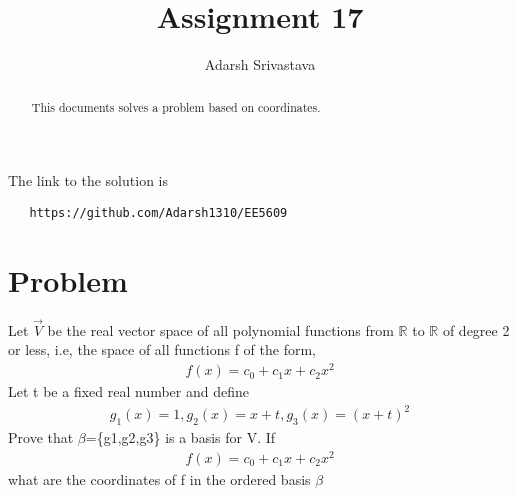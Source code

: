 \documentclass[journal,12pt,twocolumn]{IEEEtran}
\begin{document}
       \def\rightbox#1{\makebox[0in][r]{#1}}
       \def\centbox#1{\makebox[0in]{#1}}
       \def\topbox#1{\raisebox{-\baselineskip}[0in][0in]{#1}}
       \def\midbox#1{\raisebox{-0.5\baselineskip}[0in][0in]{#1}}
  \vspace{3cm}
  \title{Assignment 17}
  \author{Adarsh Srivastava}
  \maketitle
  \newpage
  \bigskip
  \renewcommand{\thetable}{\theenumi}
  The link to the solution is
  \begin{lstlisting}
   https://github.com/Adarsh1310/EE5609
  \end{lstlisting}
  \begin{abstract}
  This documents solves a problem based on coordinates.
  \end{abstract}
   \section{\textbf{Problem}}
   Let $\vec{V}$ be the real vector space of all polynomial functions from $\mathbb{R}$ to $\mathbb{R}$ of degree 2 or less, i.e, the space of all functions f of the form,
   \begin{align*}
   f(x)=c_0+c_1x+c_2x^2
   \end{align*} 
   Let t be a fixed real number and define
   \begin{align*}
   g_1(x)=1,        g_2(x)=x+t,         g_3(x)=(x+t)^2
   \end{align*}
   Prove that $\beta$=\{g1,g2,g3\} is a basis for V. If 
   \begin{align*}
   f(x)=c_0+c_1x+c_2x^2
   \end{align*}
   what are the coordinates of f in the ordered basis $\beta$
\end{document}

